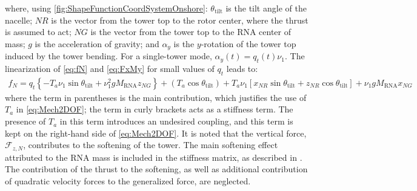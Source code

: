 \documentclass[wes, manuscript]{copernicus}
\begin{document}
where, using \autoref{fig:ShapeFunctionCoordSystemOnshore}: $\theta_\text{tilt}$ is the tilt angle of the nacelle; $NR$ is the vector from the tower top to the rotor center, where the thrust is assumed to act; $NG$ is the vector from the tower top to the RNA center of mass; $g$ is the acceleration of gravity; and $\alpha_y$ is the $y$-rotation of the tower top induced by the tower bending. For a single-tower mode, $\alpha_y(t) = q_t(t) \nu_1$.
% 
The linearization of \autoref{eq:fN} and \autoref{eq:FxMy} for small values of $q_t$ leads to:
\begin{align}
   f_N = 
    q_t\left\{-T_a \nu_1 \sin\theta_\text{tilt} 
   +  \nu_1^2 g M_\text{RNA} z_{NG} \right\}
   + \left( T_a \cos\theta_\text{tilt} \right)
   + T_a \nu_1\left[x_{NR}\sin\theta_\text{tilt} +z_{NR} \cos\theta_\text{tilt} \right]
   + \nu_1 g M_\text{RNA} x_{NG}
\end{align}
where the term in parentheses is the main contribution, which justifies the use of $T_a$ in \autoref{eq:Mech2DOF}; the term in curly brackets acts as a stiffness term. The presence of  $T_a$ in this term introduces an undesired coupling, and this term is kept on the right-hand side  of \autoref{eq:Mech2DOF}.
%
It is noted that the vertical force, $\mathcal{F}_{z,N}$, contributes to the softening of the tower.
The main softening effect attributed to the RNA mass is included in the stiffness matrix, as described in \cite{branlard:2019flex}. The contribution of the thrust to the softening, as well as additional contribution of quadratic velocity forces to the generalized force, are neglected.  
\end{document}
